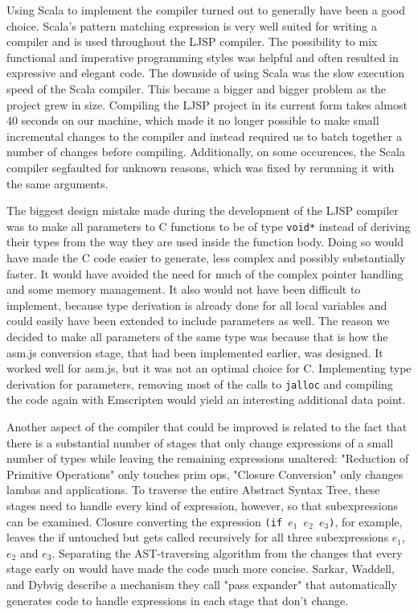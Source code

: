 \documentclass[11pt]{report}
\begin{document}
Using Scala to implement the compiler turned out to generally have been a good choice. Scala's pattern matching expression is very well suited for writing a compiler and is used throughout the LJSP compiler. The possibility to mix functional and imperative programming styles was helpful and often resulted in expressive and elegant code. The downside of using Scala was the slow execution speed of the Scala compiler. This became a bigger and bigger problem as the project grew in size. Compiling the LJSP project in its current form takes almost 40 seconds on our machine, which made it no longer possible to make small incremental changes to the compiler and instead required us to batch together a number of changes before compiling. Additionally, on some occurences, the Scala compiler segfaulted for unknown reasons, which was fixed by rerunning it with the same arguments.

The biggest design mistake made during the development of the LJSP compiler was to make all parameters to C functions to be of type \texttt{void*} instead of deriving their types from the way they are used inside the function body. Doing so would have made the C code easier to generate, less complex and possibly substantially faster. It would have avoided the need for much of the complex pointer handling and some memory management. It also would not have been difficult to implement, because type derivation is already done for all local variables and could easily have been extended to include parameters as well. The reason we decided to make all parameters of the same type was because that is how the asm.js conversion stage, that had been implemented earlier, was designed. It worked well for asm.js, but it was not an optimal choice for C. Implementing type derivation for parameters, removing most of the calls to \texttt{jalloc} and compiling the code again with Emscripten would yield an interesting additional data point.

Another aspect of the compiler that could be improved is related to the fact that there is a substantial number of stages that only change expressions of a small number of types while leaving the remaining expressions unaltered: "Reduction of Primitive Operations" only touches prim ops, "Closure Conversion" only changes lambas and applications. To traverse the entire Abstract Syntax Tree, these stages need to handle every kind of expression, however, so that subexpressions can be examined. Closure converting the expression \texttt{(if $e_1$ $e_2$ $e_3$)}, for example, leaves the if untouched but gets called recursively for all three subexpressions $e_1$, $e_2$ and $e_3$. Separating the AST-traversing algorithm from the changes that every stage early on would have made the code much more concise. Sarkar, Waddell, and Dybvig describe \cite{nanopass} a mechanism they call "pass expander" that automatically generates code to handle expressions in each stage that don't change.
\end{document}
